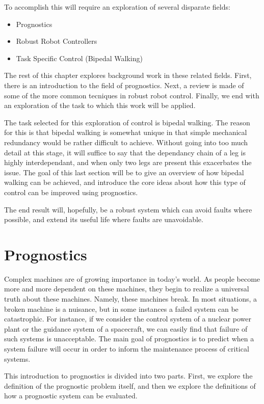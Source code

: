 \documentclass[12pt]{article}
\begin{document}
To accomplish this will require an exploration of several disparate
fields:
\begin{itemize}
\item Prognostics
\item Robust Robot Controllers
\item Task Specific Control (Bipedal Walking)
\end{itemize}
The rest of this chapter explores background work in these related
fields.  First, there is an introduction to the field of prognostics.
Next, a review is made of some of the more common tecniques in robust
robot control.  Finally, we end with an exploration of the task to
which this work will be applied.

The task selected for this exploration of control is bipedal walking.
The reason for this is that bipedal walking is somewhat unique in that
simple mechanical redundancy would be rather difficult to achieve.
Without going into too much detail at this stage, it will suffice to
say that the dependancy chain of a leg is highly interdependant, and
when only two legs are present this exacerbates the issue.
The goal of this last section will be to give an overview of how
bipedal walking can be achieved, and introduce the core ideas about
how this type of control can be improved using prognostics.

The end result will, hopefully, be a robust system which can avoid
faults where possible, and extend its useful life where faults are
unavoidable.

\section{Prognostics}
Complex machines are of growing importance in today's world.  As people
become more and more dependent on these machines, they begin to realize a
universal truth about these machines.  Namely, these machines break.  In most
situations, a broken machine is a nuisance, but in some instances a failed
system can be catastrophic.  For instance, if we consider the control system of
a nuclear power plant or the guidance system of a spacecraft, we can easily
find that failure of such systems is unacceptable.  The main goal of
prognostics is to predict when a system failure will occur in order to inform
the maintenance process of critical systems.

This introduction to prognostics is divided into two parts.  First, we explore
the definition of the prognostic problem itself, and then we explore the
definitions of how a prognostic system can be evaluated.
\end{document}
